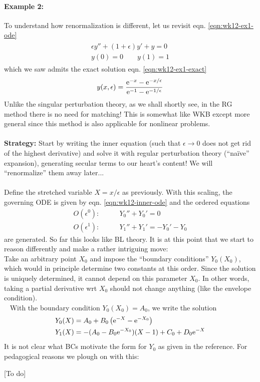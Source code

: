 \paragraph{Example 2:} To understand how renormalization is different, let us revisit eqn. \ref{eqn:wk12-ex1-ode} 
\begin{gather*}
\begin{split}
\epsilon y'' + (1+\epsilon)y' + y = 0 \\
y(0)=0 \qquad y(1)=1
\end{split}
\end{gather*}
which we saw admits the exact solution eqn. \ref{eqn:wk12-ex1-exact}
\begin{gather*}
	y(x,\epsilon) = \frac{\mathrm{e}^{-x} - \mathrm{e}^{-x/\epsilon}}{\mathrm{e}^{-1} - \mathrm{e}^{-1/\epsilon}}
\end{gather*}
Unlike the singular perturbation theory, as we shall shortly see, in the RG method there is no need for matching! This is somewhat like WKB except more general since this method is also applicable for nonlinear problems. \\\\
{\bf Strategy:} Start by writing the inner equation (such that $\epsilon \rightarrow 0$ does not get rid of the highest derivative) and solve it with regular perturbation theory (``na\"ive'' expansion), generating secular terms to our heart's content! We will ``renormalize'' them away later... \\\\
Define the stretched variable $X = x/\epsilon$ as previously. With this scaling, the governing ODE is given by eqn. \ref{eqn:wk12-inner-ode} and the ordered equations
\begin{align*}
	O(\epsilon^0): \qquad & Y_0'' + Y_0' = 0 \\
	O(\epsilon^1): \qquad & Y_1'' + Y_1' = -Y_0' - Y_0 
\end{align*}
are generated. So far this looks like BL theory. It is at this point that we start to reason differently and make a rather intriguing move: \\

 {\small Take an arbitrary point $X_0$ and impose the ``boundary conditions'' $Y_0(X_0)$, which would in principle determine two constants at this order. Since the solution is uniquely determined, it cannot depend on this parameter $X_0$. In other words, taking a partial derivative wrt $X_0$ should not change anything (like the envelope condition).}\\
\ \newline 
With the boundary condition $Y_0(X_0)=A_0$, we write the solution
\begin{align*}
	Y_0(X) &= A_0 + B_0 \left(\mathrm{e}^{-X} - \mathrm{e}^{-X_0}\right) \\
	Y_1(X) &= -(A_0 - B_0 \mathrm{e}^{-X_0})(X-1) + C_0 + D_0 \mathrm{e}^{-X}
\end{align*}
It is not clear what BCs motivate the form for $Y_0$ as given in the reference. For pedagogical reasons we plough on with this:

{\color{red} [To do]}















